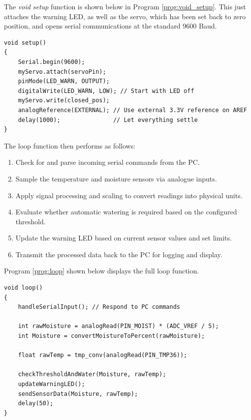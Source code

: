 \documentclass[a4paper,11pt]{article}
\begin{document}
The \textit{void setup} function is shown below in 
Program \ref{prog:void_setup}. 
This just attaches the warning LED,
as well as the servo, which has been set back to zero position,
and opens serial communications at the standard 9600 Baud.

\begin{lstlisting}[style=cpp-style, 
    caption={\textit{void setup} function}, label={prog:void_setup}]
void setup()
{
    Serial.begin(9600);
    myServo.attach(servoPin);
    pinMode(LED_WARN, OUTPUT);
    digitalWrite(LED_WARN, LOW); // Start with LED off
    myServo.write(closed_pos);
    analogReference(EXTERNAL); // Use external 3.3V reference on AREF
    delay(1000);               // Let everything settle
}
\end{lstlisting}

The loop function then performs as follows: 

\begin{enumerate}[label=\Roman*., nosep]
    \item Check for and parse incoming serial commands from the PC.
    \item Sample the temperature and moisture sensors via analogue inputs.
    \item Apply signal processing and scaling to convert 
    readings into physical units.
    \item Evaluate whether automatic watering is required based on the configured threshold.
    \item Update the warning LED based on current sensor values and set limits.
    \item Transmit the processed data back to the PC for logging and display.
\end{enumerate}

Program \ref{prog:loop} shown below displays the full loop function.

\begin{lstlisting}[style=cpp-style, 
    caption={Main \textit{loop} function}, label={prog:loop}]
void loop()
{
    handleSerialInput(); // Respond to PC commands

    int rawMoisture = analogRead(PIN_MOIST) * (ADC_VREF / 5);
    int Moisture = convertMoistureToPercent(rawMoisture);

    float rawTemp = tmp_conv(analogRead(PIN_TMP36));

    checkThresholdAndWater(Moisture, rawTemp);
    updateWarningLED();
    sendSensorData(Moisture, rawTemp);
    delay(50);
}
\end{lstlisting}
\end{document}
